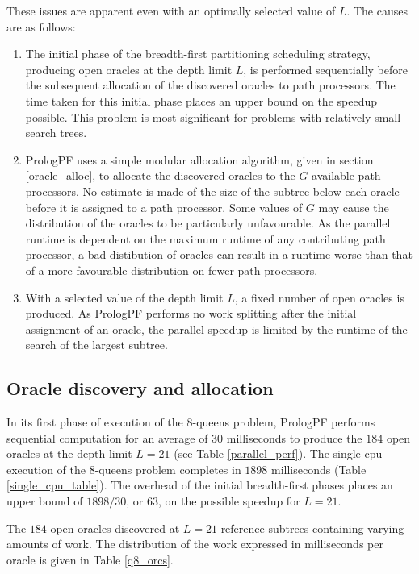These issues are apparent even with an optimally selected value of $L$.  The causes are
as follows:
\begin{enumerate}
\item{The initial phase of the breadth-first partitioning scheduling 
  strategy, producing open oracles at the depth limit $L$, is performed sequentially
  before the subsequent allocation of the discovered oracles to path processors.  The
  time taken for this initial phase places an upper bound on the speedup possible.
  This problem is most significant for problems with relatively small search trees.}
\item{PrologPF uses a simple modular allocation algorithm, given in section
  \ref{oracle_alloc}, to allocate the discovered oracles to the $G$ available path
  processors.  No estimate is made of the size of the subtree below each oracle before
  it is assigned to a path processor.  Some values of $G$ may cause the distribution
  of the oracles to be particularly unfavourable.
  As the parallel runtime is dependent on the maximum runtime of any
  contributing path processor, a bad distibution of oracles can
  result in a runtime worse than
  that of a more favourable distribution on fewer path processors.}
\item{With a selected value of the depth limit $L$, a fixed number of open oracles
  is produced.  As PrologPF performs no work splitting after the initial assignment
  of an oracle, the parallel speedup is limited by the runtime of the search of the
  largest subtree.}
\end{enumerate}

\subsection{Oracle discovery and allocation}
\label{orc_discovery}

In its first phase of execution of the 8-queens problem, PrologPF
 performs sequential computation for an average of $30$ milliseconds to
 produce the $184$ open oracles at the depth limit $L=21$ (see Table
 \ref{parallel_perf}).
The single-cpu execution of the 8-queens problem completes in $1898$ milliseconds (Table
\ref{single_cpu_table}).  The overhead of the initial breadth-first phases places an
upper bound of $1898/30$, or $63$, on the possible speedup for $L=21$.

The $184$ open oracles discovered at $L=21$ reference subtrees containing varying amounts
of work.  The distribution of the work expressed in milliseconds per oracle is given
in Table \ref{q8_orcs}.

